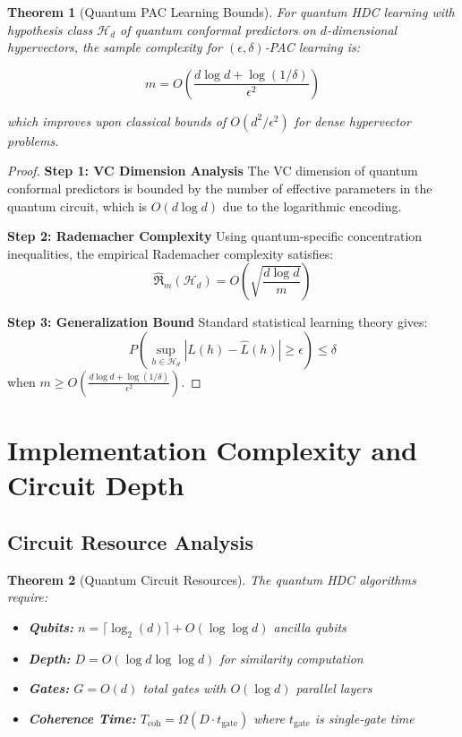 \documentclass[11pt]{article}
\newtheorem{theorem}{Theorem}[section]
\begin{document}
\begin{theorem}[Quantum PAC Learning Bounds]
\label{thm:pac_learning}
For quantum HDC learning with hypothesis class $\mathcal{H}_d$ of quantum conformal predictors on $d$-dimensional hypervectors, the sample complexity for $(\epsilon, \delta)$-PAC learning is:

$$m = O\left(\frac{d \log d + \log(1/\delta)}{\epsilon^2}\right)$$

which improves upon classical bounds of $O(d^2/\epsilon^2)$ for dense hypervector problems.
\end{theorem}

\begin{proof}
\textbf{Step 1: VC Dimension Analysis}
The VC dimension of quantum conformal predictors is bounded by the number of effective parameters in the quantum circuit, which is $O(d \log d)$ due to the logarithmic encoding.

\textbf{Step 2: Rademacher Complexity}
Using quantum-specific concentration inequalities, the empirical Rademacher complexity satisfies:
$$\hat{\mathfrak{R}}_m(\mathcal{H}_d) = O\left(\sqrt{\frac{d \log d}{m}}\right)$$

\textbf{Step 3: Generalization Bound}
Standard statistical learning theory gives:
$$P\left(\sup_{h \in \mathcal{H}_d} |L(h) - \hat{L}(h)| \geq \epsilon\right) \leq \delta$$
when $m \geq O\left(\frac{d \log d + \log(1/\delta)}{\epsilon^2}\right)$.
\end{proof}

\section{Implementation Complexity and Circuit Depth}

\subsection{Circuit Resource Analysis}

\begin{theorem}[Quantum Circuit Resources]
\label{thm:circuit_resources}
The quantum HDC algorithms require:
\begin{itemize}
\item \textbf{Qubits:} $n = \lceil \log_2(d) \rceil + O(\log \log d)$ ancilla qubits
\item \textbf{Depth:} $D = O(\log d \log \log d)$ for similarity computation
\item \textbf{Gates:} $G = O(d)$ total gates with $O(\log d)$ parallel layers
\item \textbf{Coherence Time:} $T_{\text{coh}} = \Omega(D \cdot t_{\text{gate}})$ where $t_{\text{gate}}$ is single-gate time
\end{itemize}
\end{theorem}
\end{document}
